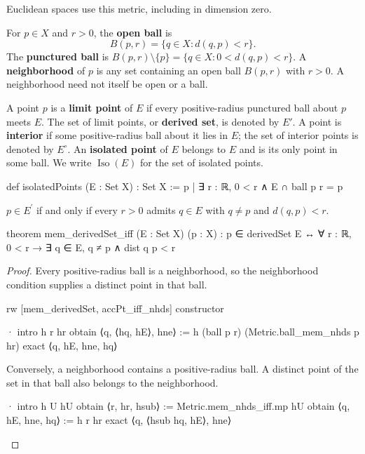 Euclidean spaces use this metric, including in dimension zero.

\begin{definition}
  \label{an1:def:neighborhood-open-ball}
  For $p\in X$ and $r>0$, the \textbf{open ball} is
  \[
    B(p,r)=\{q\in X:d(q,p)<r\}.
  \]
  The \textbf{punctured ball} is $B(p,r)\setminus\{p\}=\{q\in X:0<d(q,p)<r\}$.
  A \textbf{neighborhood} of $p$ is any set containing an open ball $B(p,r)$ with $r>0$.
  A neighborhood need not itself be open or a ball.
\end{definition}

\begin{definition}
  \label{an1:def:limit-interior-isolated-points}
  A point $p$ is a \textbf{limit point} of $E$ if every positive-radius punctured ball about $p$
  meets $E$.
  The set of limit points, or \textbf{derived set}, is denoted by $E'$.
  A point is \textbf{interior} if some positive-radius ball about it lies in $E$; the set of
  interior points is denoted by $E^\circ$.
  An \textbf{isolated point} of $E$ belongs to $E$ and is its only point in some ball.
  We write $\operatorname{Iso}(E)$ for the set of isolated points.
  \begin{lean}
    def isolatedPoints (E : Set X) : Set X :=
      {p | ∃ r : ℝ, 0 < r ∧ E ∩ ball p r = {p}}
  \end{lean}
\end{definition}

\begin{lemma}
  \label{an1:lem:mem-derivedSet-iff}
  $p\in E^{\prime}$ if and only if every $r>0$ admits $q\in E$ with $q\ne p$ and $d(q,p)<r$.

  \begin{lean}
    theorem mem_derivedSet_iff (E : Set X) (p : X) :
        p ∈ derivedSet E ↔ ∀ r : ℝ, 0 < r → ∃ q ∈ E, q ≠ p ∧ dist q p < r
  \end{lean}
\end{lemma}

\begin{proof}
  Every positive-radius ball is a neighborhood, so the neighborhood condition supplies a distinct
  point in that ball.

  \begin{lean}
    rw [mem_derivedSet, accPt_iff_nhds]
    constructor

    · intro h r hr
      obtain ⟨q, ⟨hq, hE⟩, hne⟩ := h (ball p r) (Metric.ball_mem_nhds p hr)
      exact ⟨q, hE, hne, hq⟩
  \end{lean}

  Conversely, a neighborhood contains a positive-radius ball.
  A distinct point of the set in that ball also belongs to the neighborhood.

  \begin{lean}
    · intro h U hU
      obtain ⟨r, hr, hsub⟩ := Metric.mem_nhds_iff.mp hU
      obtain ⟨q, hE, hne, hq⟩ := h r hr
      exact ⟨q, ⟨hsub hq, hE⟩, hne⟩
  \end{lean}
\end{proof}

